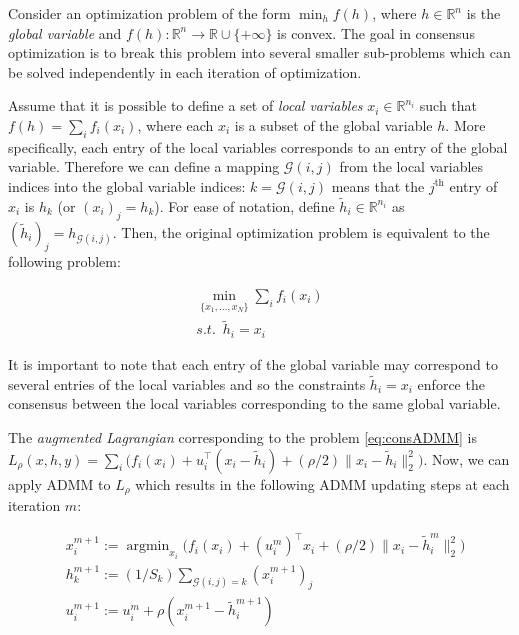\documentclass{article}
\DeclareMathOperator*{\argmin}{argmin}
\begin{document}
Consider an optimization problem of the form $\min_h f(h)$, where $h\in\mathbb{R}^n$ is the \textit{global variable} and $f(h):\mathbb{R}^n \rightarrow \mathbb{R}\cup \{+\infty\}$ is convex. The goal in consensus optimization is to break this problem into several smaller sub-problems which can be solved independently in each iteration of optimization. 

Assume that it is possible to define a set of \textit{local variables} $x_i \in \mathbb{R}^{n_i}$ such that $f(h)=\sum_i f_i(x_i)$, where each $x_i$ is a subset of the global variable $h$. More specifically, each entry of the local variables corresponds to an entry of the global variable. Therefore we can define a mapping $\mathscr{G}(i,j)$ from the local variables indices into the global variable indices: $k=\mathscr{G}(i,j)$ means that the $j^\text{th}$ entry of $x_i$ is $h_k$ (or $(x_i)_j=h_k$). For ease of notation, define $\tilde{h}_i \in \mathbb{R}^{n_i}$ as $(\tilde{h}_i)_j=h_{\mathscr{G}(i,j)}$. Then, the original optimization problem is equivalent to the following problem: 

\begin{equation}
\begin{aligned}
\min_{\{x_1,...,x_N  \}} \sum_i f_i(x_i)\\
 s.t. \,\,\, \tilde{h}_i=x_i \,\,\,\,\,\,
\end{aligned}
\label{eq:consADMM}
\end{equation}

It is important to note that each entry of the global variable may correspond to several entries of the local variables and so the constraints $\tilde{h}_i=x_i$ enforce the consensus between the local variables corresponding to the same global variable. 

The \textit{augmented Lagrangian} corresponding to the problem \ref{eq:consADMM} is $L_\rho(x,h,y)=\sum_i \big(f_i(x_i)+u_i^\top(x_i-\tilde{h}_i) + (\rho/2) \lVert x_i-\tilde{h}_i \lVert_2^2 \big)$. Now, we can apply ADMM to $L_\rho$ which results in the following ADMM updating steps at each iteration $m$:

\begin{equation}
\begin{aligned}
& x_i^{m+1}:=\argmin_{x_i} \bigg( f_i(x_i) + (u_i^m)^\top x_i + (\rho/2) \lVert x_i-\tilde{h}_i^m \lVert_2^2\bigg)\\
& h_k^{m+1}:=(1/S_k)\sum_{\mathscr{G}(i,j)=k} (x_i^{m+1})_j\\
& u_i^{m+1}:=u_i^m + \rho (x_i^{m+1}-\tilde{h}_i^{m+1})
\end{aligned}
\label{eq:ADMM_steps}
\end{equation}
\end{document}
